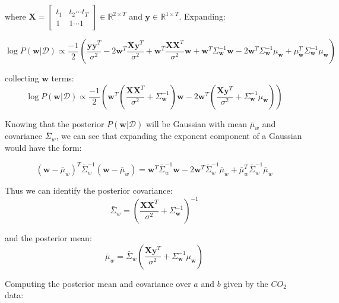 \documentclass[12pt]{article}
\begin{document}
where $\textbf{X} =  \begin{bmatrix}
                 t_1 & t_2 \cdots t_T \\
                 1 & 1 \cdots 1
         \end{bmatrix} \in  \mathbb{R}^{2 \times T}$ and $\textbf{y} \in \mathbb{R}^{1 \times T}$.
Expanding:

\[\log P(\textbf{w} | \mathcal{D}) \propto
  \frac{-1}{2} \left( \frac{\textbf{y} \textbf{y}^T}{\sigma^2} - 2\textbf{w}^T \frac{\textbf{X}\textbf{y}^T}{\sigma^2} + \textbf{w}^T \frac{\textbf{X} \textbf{X}^T}{\sigma^2} \textbf{w} +  \textbf{w}^T \Sigma_{\textbf{w}}^{-1}  \textbf{w} - 2\textbf{w}^T \Sigma_{\textbf{w}}^{-1}\mu_{\textbf{w}} + \mu_{\textbf{w}}^T\Sigma_{\textbf{w}}^{-1}\mu_{\textbf{w}} \right)
\]

collecting $\textbf{w}$ terms:
\[\log P(\textbf{w} | \mathcal{D}) \propto
  \frac{-1}{2} \left( \textbf{w}^T \left(\frac{\textbf{X} \textbf{X}^T}{\sigma^2} + \Sigma_{\textbf{w}}^{-1} \right)  \textbf{w} - 2\textbf{w}^T \left(\frac{\textbf{X}\textbf{y}^T}{\sigma^2} + \Sigma_{\textbf{w}}^{-1} \mu_{\textbf{w}}\right)  \right)
\]

Knowing that the posterior $P(\textbf{w} | \mathcal{D})$ will be Gaussian with mean $\bar{\mu}_w$ and covariance $\bar{\Sigma}_w$, we can see that expanding the exponent component of a Gaussian would have the form:

\[\left( \textbf{w} - \bar{\mu}_w \right)^T \bar{\Sigma}_w^{-1} \left( \textbf{w} - \bar{\mu}_w \right) = \textbf{w}^T \bar{\Sigma}_w^{-1} \textbf{w} -2 \textbf{w}^T \bar{\Sigma}_w^{-1} \bar{\mu}_w + \bar{\mu}_w^T \bar{\Sigma}_w^{-1} \bar{\mu}_w\]

Thus we can identify the posterior covariance:
\[\bar{\Sigma}_w = \left(\frac{\textbf{X} \textbf{X}^T}{\sigma^2} + \Sigma_{\textbf{w}}^{-1} \right)^{-1}\]

and the posterior mean:
\[\bar{\mu}_w = \bar{\Sigma}_w \left(\frac{\textbf{X}\textbf{y}^T}{\sigma^2} + \Sigma_{\textbf{w}}^{-1} \mu_{\textbf{w}}\right) \]


\newpage
Computing the posterior mean and covariance over $a$ and $b$ given by the $CO_2$ data:
\end{document}
